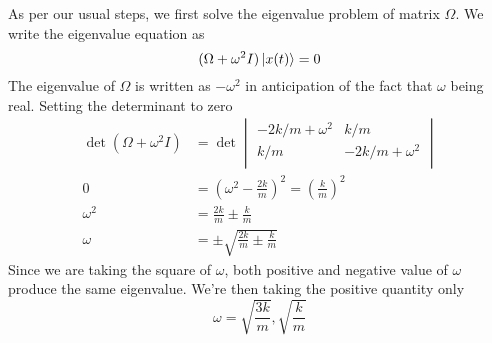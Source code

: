\documentclass[../main.tex]{subfiles}
\begin{document}
As per our usual steps, we first solve the eigenvalue problem of matrix $\Omega$.
We write the eigenvalue equation as
\begin{equation*}
	(\Omega+\omega^2I)\ket{x(t)}=0
\end{equation*}
The eigenvalue of $\Omega$ is written as $-\omega^2$ in anticipation of the fact that $\omega$ being real.
Setting the determinant to zero
\begin{align*}
	\det (\Omega+\omega^2 I) & =\det
	\begin{vmatrix}
		-2k/m+\omega^2 & k/m            \\
		k/m            & -2k/m+\omega^2 \\
	\end{vmatrix}                                                                 \\
	0                        & =\left(\omega^2-\frac{2k }{m }\right)^2=\left(\frac{k }{m }\right)^2 \\
	\omega^2                 & =\frac{2k }{m }\pm \frac{k }{m}                                      \\
	\omega                   & =\pm \sqrt{\frac{2k }{m }\pm \frac{k }{m }}
\end{align*}
Since we are taking the square of $\omega$, both positive and negative value of $\omega$ produce the same eigenvalue.
We're then taking the positive quantity only
\begin{equation*}
	\omega=\sqrt{\frac{3k}{m }},\sqrt{\frac{k }{m}}
\end{equation*}
\end{document}
